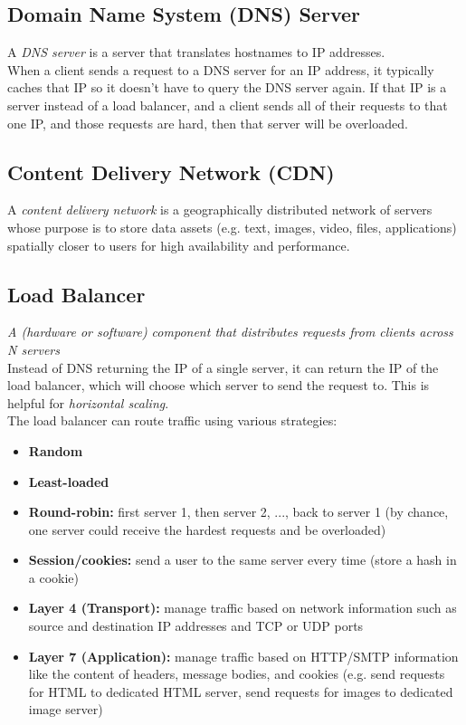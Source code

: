 \documentclass[12pt, titlepage]{article}
\begin{document}
\subsection{Domain Name System (DNS) Server}

A \textit{DNS server} is a server that translates hostnames to IP addresses. \\

When a client sends a request to a DNS server for an IP address, it typically caches that IP so it doesn't have to query the DNS server again. If that IP is a server instead of a load balancer, and a client sends all of their requests to that one IP, and those requests are hard, then that server will be overloaded.

\subsection{Content Delivery Network (CDN)}

A \textit{content delivery network} is a geographically distributed network of servers whose purpose is to store data assets (e.g. text, images, video, files, applications) spatially closer to users for high availability and performance.

\subsection{Load Balancer}

\textit{A (hardware or software) component that distributes requests from clients across N servers} \\

Instead of DNS returning the IP of a single server, it can return the IP of the load balancer, which will choose which server to send the request to. This is helpful for \textit{horizontal scaling}. \\

The load balancer can route traffic using various strategies:

\begin{itemize}
  \item \textbf{Random}
  \item \textbf{Least-loaded}
  \item \textbf{Round-robin:} first server 1, then server 2, ..., back to server 1 (by chance, one server could receive the hardest requests and be overloaded)
  \item \textbf{Session/cookies:} send a user to the same server every time (store a hash in a cookie)
  \item \textbf{Layer 4 (Transport):} manage traffic based on network information such as source and destination IP addresses and TCP or UDP ports
  \item \textbf{Layer 7 (Application):} manage traffic based on HTTP/SMTP information like the content of headers, message bodies, and cookies (e.g. send requests for HTML to dedicated HTML server, send requests for images to dedicated image server)
\end{itemize}
\end{document}
